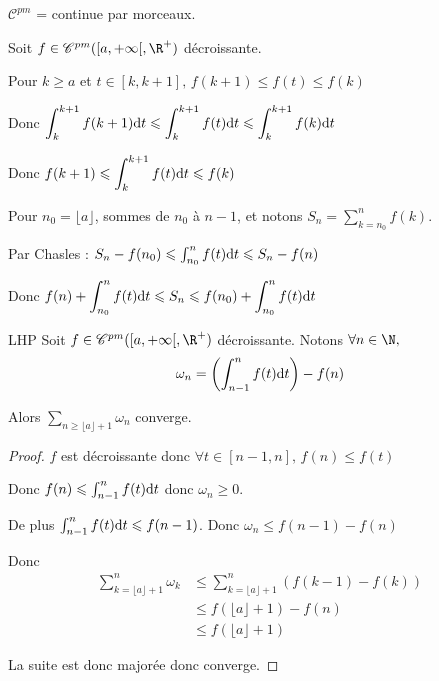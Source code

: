 $\mathscr C^{pm}$ = continue par morceaux.

Soit $f \in \mathscr C^{pm}( [a, + \infty[ , \R^+)$ décroissante. 

Pour $k \geqslant a$ et $ t \in [k, k+ 1 ], \, f(k + 1) \leqslant f(t) \leqslant f(k)$

Donc $\displaystyle \int_{k}^{k + 1} f(k + 1) \text d t \leqslant \int_{k}^{k + 1} f(t) \text d t \leqslant \int_{k}^{k + 1} f(k) \text d t$

Donc $\displaystyle f(k + 1) \leqslant \int_{k}^{k + 1} f(t) \text d t \leqslant f(k)$

Pour $n_0 = \lfloor a \rfloor$, sommes de $n_0$ à $n - 1$, et notons $\displaystyle S_n = \sum_{k = n_0}^{n} f(k)$.

Par Chasles : $S_n - f(n_0) \leqslant \int_{n_0}^{n} f(t) \text d t \leqslant S_n - f(n)$

Donc $\displaystyle f(n) + \int_{n_0}^{n} f(t) \text d t \leqslant S_n \leqslant f(n_0) + \int_{n_0}^{n} f(t) \text d t$


\begin{theoreme}{LHP}{}
    Soit $f \in \mathscr C^{pm}([a, + \infty[, \R^+)$ décroissante. 
    Notons $\forall n \in \N,$ 
    $$\omega_n = \left( \int_{n - 1 }^{n } f(t) \text d t \right) - f(n)$$

    Alors $\displaystyle \sum_{n \geqslant \lfloor a \rfloor + 1} \omega_n$ converge.
\end{theoreme}


\begin{proof}
    $f$ est décroissante donc $\forall t \in [n - 1, n], \, f(n) \leqslant f(t)$ 

    Donc $f(n) \leqslant \int_{n - 1}^{n} f(t) \text d t$ donc $\omega_n \geqslant 0$.

    De plus $\int_{n - 1 }^{n } f(t) \text d t \leqslant f(n - 1)$. Donc $\omega_n \leqslant f(n - 1 ) - f(n)$

    Donc 
    \begin{align*}
        \sum_{k = \lfloor a \rfloor + 1}^{n} \omega_k & \leqslant \sum_{k = \lfloor a \rfloor + 1}^{n } (f(k - 1) - f(k)) \\
                                                        & \leqslant f(\lfloor a \rfloor + 1) - f(n) \\
                                                        & \leqslant f(\lfloor a \rfloor + 1)
    \end{align*}

    La suite est donc majorée donc converge. 
\end{proof}

